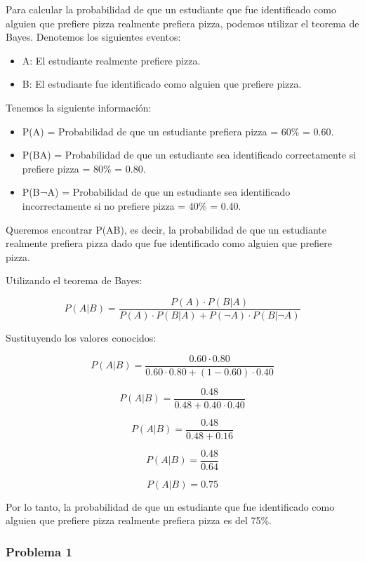 \documentclass[
]{article}
\providecommand{\tightlist}{%
  \setlength{\itemsep}{0pt}\setlength{\parskip}{0pt}}
\begin{document}
Para calcular la probabilidad de que un estudiante que fue identificado
como alguien que prefiere pizza realmente prefiera pizza, podemos
utilizar el teorema de Bayes. Denotemos los siguientes eventos:

\begin{itemize}
\tightlist
\item
  A: El estudiante realmente prefiere pizza.
\item
  B: El estudiante fue identificado como alguien que prefiere pizza.
\end{itemize}

Tenemos la siguiente información:

\begin{itemize}
\tightlist
\item
  P(A) = Probabilidad de que un estudiante prefiera pizza = 60\% = 0.60.
\item
  P(B\textbar A) = Probabilidad de que un estudiante sea identificado
  correctamente si prefiere pizza = 80\% = 0.80.
\item
  P(B\textbar¬A) = Probabilidad de que un estudiante sea identificado
  incorrectamente si no prefiere pizza = 40\% = 0.40.
\end{itemize}

Queremos encontrar P(A\textbar B), es decir, la probabilidad de que un
estudiante realmente prefiera pizza dado que fue identificado como
alguien que prefiere pizza.

Utilizando el teorema de Bayes:

\[P(A|B) = \frac{P(A) \cdot P(B|A)}{P(A) \cdot P(B|A) + P(¬A) \cdot P(B|¬A)}\]

Sustituyendo los valores conocidos:

\[P(A|B) = \frac{0.60 \cdot 0.80}{0.60 \cdot 0.80 + (1 - 0.60) \cdot 0.40}\]

\[P(A|B) = \frac{0.48}{0.48 + 0.40 \cdot 0.40}\]

\[P(A|B) = \frac{0.48}{0.48 + 0.16}\]

\[P(A|B) = \frac{0.48}{0.64}\]

\[P(A|B) = 0.75\]

Por lo tanto, la probabilidad de que un estudiante que fue identificado
como alguien que prefiere pizza realmente prefiera pizza es del 75\%.

\hypertarget{problema-1-2}{%
\subsubsection{Problema 1}\label{problema-1-2}}
\end{document}
